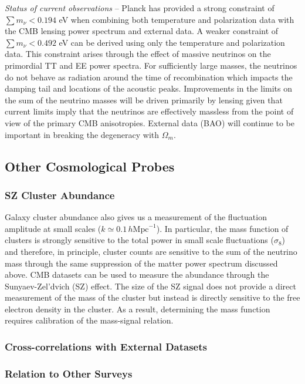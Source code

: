 {\it Status of current observations} -- Planck has provided a strong constraint of $\sum m_\nu < 0.194$ eV when combining both temperature and polarization data with the CMB lensing power spectrum and external data.  A weaker constraint of $\sum m_\nu < 0.492$ eV can be derived using only the temperature and polarization data.  This constraint arises through the effect of massive neutrinos on the primordial TT and EE power spectra.  For sufficiently large masses, the neutrinos do not behave as radiation around the time of recombination which impacts the damping tail and locations of the acoustic peaks.  Improvements in the limits on the sum of the neutrino masses will be driven primarily by lensing given that current limits imply that the neutrinos are effectively massless from the point of view of the primary CMB anisotropies.  External data (BAO) will continue to be important in breaking the degeneracy with $\Omega_m$.  

\subsection{Other Cosmological Probes}

\subsubsection{SZ Cluster Abundance}

Galaxy cluster abundance also gives us a measurement of the fluctuation amplitude at small scales ($k\simeq 0.1 \, h\mathrm{Mpc}^{-1}$).  In particular, the mass function of clusters is strongly sensitive to the total power in small scale fluctuations ($\sigma_8$) and therefore, in principle, cluster counts are sensitive to the sum of the neutrino mass through the same suppression of the matter power spectrum discussed above.
%
CMB datasets can be used to measure the abundance through the Sunyaev-Zel'dvich (SZ) effect.  The size of the SZ signal does not provide a direct measurement of the mass of the cluster but instead is directly sensitive to the free electron density in the cluster.  As a result, determining the mass function requires calibration of the mass-signal relation.  
%


\subsubsection{Cross-correlations with External Datasets}

\subsubsection{Relation to Other Surveys}

